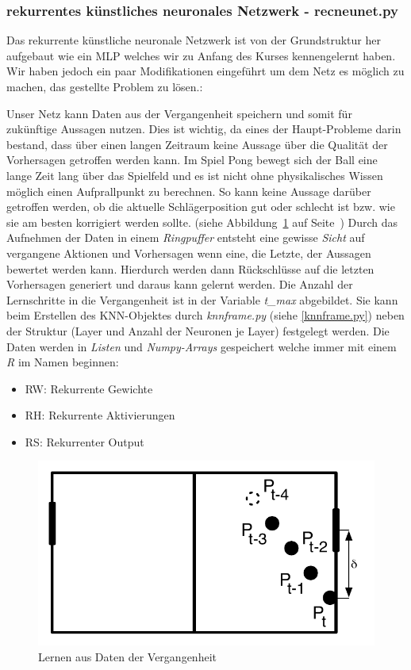\documentclass[12pt,twoside]{article}
\theoremstyle{plain}
\theoremstyle{definition}
\theoremstyle{remark}
\begin{document}
\subsubsection{rekurrentes künstliches neuronales Netzwerk - recneunet.py}
\label{recneunet.py}

Das rekurrente künstliche neuronale Netzwerk ist von der Grundstruktur her aufgebaut wie ein MLP welches wir zu Anfang des Kurses kennengelernt haben. Wir haben jedoch ein paar Modifikationen eingeführt um dem Netz es möglich zu machen, das gestellte Problem zu lösen.:

Unser Netz kann Daten aus der Vergangenheit speichern und somit für zukünftige Aussagen nutzen. Dies ist wichtig, da eines der Haupt-Probleme darin bestand, dass über einen langen Zeitraum keine Aussage über die Qualität der Vorhersagen getroffen werden kann. Im Spiel Pong bewegt sich der Ball eine lange Zeit lang über das Spielfeld und es ist nicht ohne physikalisches Wissen möglich einen Aufprallpunkt zu berechnen. So kann keine Aussage darüber getroffen werden, ob die aktuelle Schlägerposition gut oder schlecht ist bzw. wie sie am besten korrigiert werden sollte. (siehe Abbildung~\ref{fig:delayedlearning} auf Seite~\pageref{fig:delayedlearning})
Durch das Aufnehmen der Daten in einem \textit{Ringpuffer} entsteht eine gewisse \textit{Sicht} auf vergangene Aktionen und Vorhersagen wenn eine, die Letzte, der Aussagen bewertet werden kann. Hierdurch werden dann Rückschlüsse auf die letzten Vorhersagen generiert und daraus kann gelernt werden. Die Anzahl der Lernschritte in die Vergangenheit ist in der Variable \textit{t\_max} abgebildet. Sie kann beim Erstellen des KNN-Objektes durch \textit{knnframe.py} (siehe \ref{knnframe.py}) neben der Struktur (Layer und Anzahl der Neuronen je Layer) festgelegt werden. 
Die Daten werden in \textit{Listen} und \textit{Numpy-Arrays} gespeichert welche immer mit einem \textit{R} im Namen beginnen:
\begin{itemize}
  \item RW: Rekurrente Gewichte
  \item RH: Rekurrente Aktivierungen
  \item RS: Rekurrenter Output
\end{itemize}

\begin{figure}[hbtp]
	 \centerline{\includegraphics[]{delayed.pdf}}
	 {\caption{Lernen aus Daten der Vergangenheit}\label{fig:delayedlearning}}
\end{figure}
\end{document}
